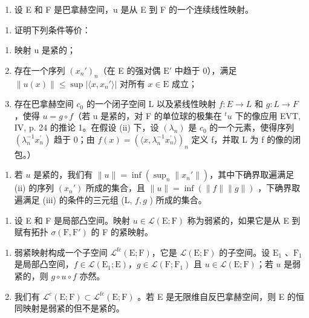 \begin{enumerate}
\def\labelenumi{\arabic{enumi})}
\setcounter{enumi}{25}
\tightlist
\item
  设 E 和 F 是巴拿赫空间，u 是从 E 到 F 的一个连续线性映射。
\end{enumerate}

\begin{enumerate}
\def\labelenumi{\alph{enumi})}
\tightlist
\item
  证明下列条件等价：
\end{enumerate}

\begin{enumerate}
\def\labelenumi{(\roman{enumi})}
\item
  映射 u 是紧的；
\item
  存在一个序列 \((x_n')_n\)（在 E 的强对偶 \(\mathrm{E}'\) 中趋于 0），满足 \(\| u(x)\| \leqslant \sup |\langle x,x_n' \rangle|\) 对所有 \(x \in \mathrm{E}\) 成立；
\item
  存在巴拿赫空间 \(c_{0}\) 的一个闭子空间 L 以及紧线性映射 \(f: E \to L\) 和 \(g: L \to F\)，使得 \(u = g \circ f\)（若 u 是紧的，对 F 的单位球的极集在 \(^{t}u\) 下的像应用 EVT, IV, p. 24 的推论 1。在假设 (ii) 下，设 \((\lambda_{n})\) 是 \(c_{0}\) 的一个元素，使得序列 \((\lambda_{n}^{-1}x_{n}^{\prime})\) 趋于 0；由 \(f(x) = (\langle x, \lambda_{n}^{-1}x_{n}^{\prime} \rangle)_{n}\) 定义 f，并取 L 为 f 的像的闭包。）
\end{enumerate}

\begin{enumerate}
\def\labelenumi{\alph{enumi})}
\setcounter{enumi}{1}
\tightlist
\item
  若 \(u\) 是紧的，我们有 \(\|u\| = \inf(\sup_n \|x_n'\|)\)，其中下确界取遍满足 (ii) 的序列 \((x_n')\) 所成的集合，且 \(\|u\| = \inf(\|f\|\|g\|)\) ，下确界取遍满足 (iii) 的条件的三元组 (L, \(f,g\) ) 所成的集合。
\end{enumerate}

\begin{enumerate}
\def\labelenumi{\arabic{enumi})}
\setcounter{enumi}{26}
\tightlist
\item
  设 E 和 F 是局部凸空间。映射 \(u \in \mathcal{L}(\mathrm{E};\mathrm{F})\) 称为弱紧的，如果它是从 E 到赋有拓扑 \(\sigma(\mathrm{F},\mathrm{F}')\) 的 F 的紧映射。
\end{enumerate}

\begin{enumerate}
\def\labelenumi{\alph{enumi})}
\item
  弱紧映射构成一个子空间 \(\mathcal{L}^{\mathrm{fc}}(\mathrm{E};\mathrm{F})\)，它是 \(\mathcal{L}(\mathrm{E};\mathrm{F})\) 的子空间。设 \(\mathrm{E}_1\) 、\(\mathrm{F}_1\) 是局部凸空间，\(f\in \mathcal{L}(\mathrm{E}_1;\mathrm{E})\)，\(g\in \mathcal{L}(\mathrm{F};\mathrm{F}_1)\) 且 \(u\in \mathcal{L}(\mathrm{E};\mathrm{F})\)；若 \(u\) 是弱紧的，则 \(g\circ u\circ f\) 亦然。
\item
  我们有 \(\mathcal{L}^{c}(\mathrm{E};\mathrm{F})\subset\mathcal{L}^{\mathrm{fc}}(\mathrm{E};\mathrm{F})\) 。若 E 是无限维自反巴拿赫空间，则 E 的恒同映射是弱紧的但不是紧的。
\end{enumerate}


